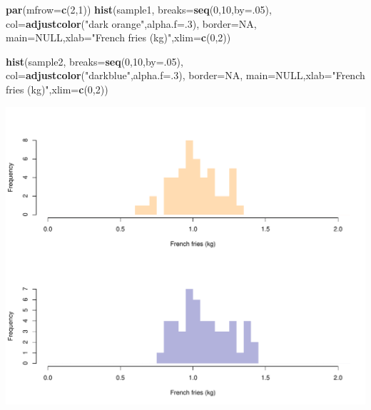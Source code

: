 \documentclass[
]{book}
\newenvironment{Shaded}{\begin{snugshade}}{\end{snugshade}}
\newcommand{\DataTypeTok}[1]{\textcolor[rgb]{0.13,0.29,0.53}{#1}}
\newcommand{\DecValTok}[1]{\textcolor[rgb]{0.00,0.00,0.81}{#1}}
\newcommand{\KeywordTok}[1]{\textcolor[rgb]{0.13,0.29,0.53}{\textbf{#1}}}
\newcommand{\NormalTok}[1]{#1}
\newcommand{\OtherTok}[1]{\textcolor[rgb]{0.56,0.35,0.01}{#1}}
\newcommand{\StringTok}[1]{\textcolor[rgb]{0.31,0.60,0.02}{#1}}
\begin{document}
\begin{Shaded}
\begin{Highlighting}[]
\KeywordTok{par}\NormalTok{(}\DataTypeTok{mfrow=}\KeywordTok{c}\NormalTok{(}\DecValTok{2}\NormalTok{,}\DecValTok{1}\NormalTok{))}
\KeywordTok{hist}\NormalTok{(sample1,}
     \DataTypeTok{breaks=}\KeywordTok{seq}\NormalTok{(}\DecValTok{0}\NormalTok{,}\DecValTok{10}\NormalTok{,}\DataTypeTok{by=}\NormalTok{.}\DecValTok{05}\NormalTok{),}
     \DataTypeTok{col=}\KeywordTok{adjustcolor}\NormalTok{(}\StringTok{"dark orange"}\NormalTok{,}\DataTypeTok{alpha.f=}\NormalTok{.}\DecValTok{3}\NormalTok{),}
     \DataTypeTok{border=}\OtherTok{NA}\NormalTok{,}
     \DataTypeTok{main=}\OtherTok{NULL}\NormalTok{,}\DataTypeTok{xlab=}\StringTok{"French fries (kg)"}\NormalTok{,}\DataTypeTok{xlim=}\KeywordTok{c}\NormalTok{(}\DecValTok{0}\NormalTok{,}\DecValTok{2}\NormalTok{))}

\KeywordTok{hist}\NormalTok{(sample2,}
     \DataTypeTok{breaks=}\KeywordTok{seq}\NormalTok{(}\DecValTok{0}\NormalTok{,}\DecValTok{10}\NormalTok{,}\DataTypeTok{by=}\NormalTok{.}\DecValTok{05}\NormalTok{),}
     \DataTypeTok{col=}\KeywordTok{adjustcolor}\NormalTok{(}\StringTok{"darkblue"}\NormalTok{,}\DataTypeTok{alpha.f=}\NormalTok{.}\DecValTok{3}\NormalTok{),}
     \DataTypeTok{border=}\OtherTok{NA}\NormalTok{,}
     \DataTypeTok{main=}\OtherTok{NULL}\NormalTok{,}\DataTypeTok{xlab=}\StringTok{"French fries (kg)"}\NormalTok{,}\DataTypeTok{xlim=}\KeywordTok{c}\NormalTok{(}\DecValTok{0}\NormalTok{,}\DecValTok{2}\NormalTok{))}
\end{Highlighting}
\end{Shaded}

\includegraphics{figures/unnamed-chunk-179-1.pdf}
\end{document}
